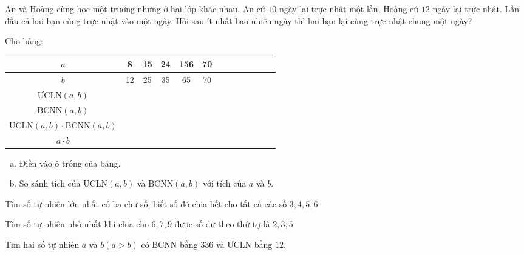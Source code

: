 \begin{bt}
An và Hoàng cùng học một trường nhưng ở hai lớp khác nhau. An cứ $10$ ngày lại trực nhật một lần, Hoàng cứ $12$ ngày lại trực nhật. Lần đầu cả hai bạn cùng trực nhật vào một ngày. Hỏi sau ít nhất bao nhiêu ngày thì hai bạn lại cùng trực nhật chung một ngày?
\end{bt}   \begin{bt}
Cho bảng:
\begin{center}
\begin{tabular}{|c|c|c|c|c|c|c|c|c|c|c|c|c|}
\hline
{$a$} & {8} & {15} & {24} & {156} & {70}\\
\hline
{$b$} & {12} & {25} & {35} & {65} & {70}\\
\hline
{$\text{ƯCLN}\left( {a,b} \right)$} &  & & & &\\
\hline
{$\text{BCNN}\left( {a,b} \right)$} &  & & & &\\
\hline
{$\text{ƯCLN}\left( {a,b} \right) \cdot \text{BCNN}\left( {a,b} \right)$ } &  & & & &\\
\hline
{$a \cdot b$} &  & & & &\\
\hline

\end{tabular}
\end{center}
\begin{enumerate}[a)]
\item Điền vào ô trống của bảng.
\item So sánh tích  của $\text{ƯCLN}\left( {a,b} \right)$  và $\text{BCNN}\left( {a,b} \right)$  với tích của $a$ và $b$.
\end{enumerate}
\end{bt}   \begin{bt}
Tìm số tự nhiên lớn nhất có ba chữ số,  biết số đó chia hết cho tất cả các số $3, 4, 5, 6$.
\end{bt}   \begin{bt}
Tìm số tự nhiên nhỏ  nhất  khi chia cho  $6, 7, 9$ được số dư theo thứ tự là $2,3,5$.
\end{bt}   \begin{bt}
Tìm hai số tự nhiên $a$ và $b \left( {a > b} \right)$ có $\text{BCNN}$ bằng $336$ và $\text{ƯCLN}$ bằng $12$.
\end{bt}